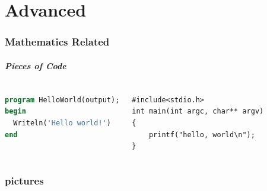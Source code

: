 \documentclass[11pt]{beamer}
\begin{document}
\part{Advanced}
\frame{\partpage}

\section{Mathematics Related}

\begin{frame}[containsverbatim]
\frametitle{Pieces of Code}
\centering{}
\vskip18pt
\begin{columns}
{{\tiny{
\begin{lstlisting}[language={PASCAL},caption= PASCAL code]
program HelloWorld(output);
begin
  Writeln('Hello world!')
end
\end{lstlisting}
}}
}
{\tiny{
\begin{lstlisting}[language={[ANSI]C},caption= C code]
#include<stdio.h>
int main(int argc, char** argv)
{
	printf("hello, world\n");
}
\end{lstlisting}
}}
\end{columns}
\end{frame}

\section{pictures}


% 
\end{document}
